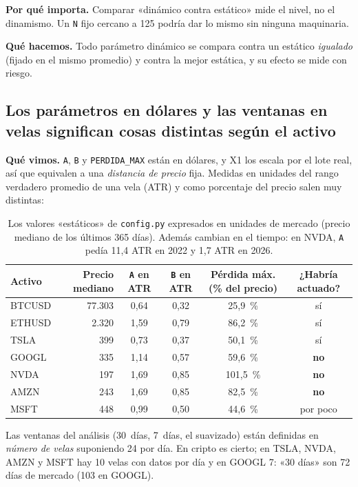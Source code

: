 \documentclass[11pt,a4paper]{article}
\newcommand{\code}[1]{\texttt{\small #1}}
\begin{document}
\textbf{Por qué importa.} Comparar «dinámico contra estático» mide el nivel, no el dinamismo. Un \code{N} fijo
cercano a 125 podría dar lo mismo sin ninguna maquinaria.

\textbf{Qué hacemos.} Todo parámetro dinámico se compara contra un estático \emph{igualado} (fijado en el mismo
promedio) y contra la mejor estática, y su efecto se mide con riesgo.

\subsection{Los parámetros en dólares y las ventanas en velas significan cosas distintas según el activo}
\textbf{Qué vimos.} \code{A}, \code{B} y \code{PERDIDA\_MAX} están en dólares, y X1 los escala por el lote real, así
que equivalen a una \emph{distancia de precio} fija. Medidas en unidades del rango verdadero promedio de una vela
(ATR) y como porcentaje del precio salen muy distintas:

\begin{table}[H]
\centering\small
\begin{tabular}{lrcccc}
\toprule
Activo & Precio mediano & \code{A} en ATR & \code{B} en ATR & Pérdida máx. (\% del precio) & ¿Habría actuado? \\
\midrule
BTCUSD & 77.303 & 0,64 & 0,32 & 25,9~\% & sí \\
ETHUSD & 2.320 & 1,59 & 0,79 & 86,2~\% & sí \\
TSLA & 399 & 0,73 & 0,37 & 50,1~\% & sí \\
GOOGL & 335 & 1,14 & 0,57 & 59,6~\% & \textbf{no} \\
NVDA & 197 & 1,69 & 0,85 & 101,5~\% & \textbf{no} \\
AMZN & 243 & 1,69 & 0,85 & 82,5~\% & \textbf{no} \\
MSFT & 448 & 0,99 & 0,50 & 44,6~\% & por poco \\
\bottomrule
\end{tabular}
\caption{Los valores «estáticos» de \code{config.py} expresados en unidades de mercado (precio mediano de los
últimos 365 días). Además cambian en el tiempo: en NVDA, \code{A} pedía 11,4 ATR en 2022 y 1,7 ATR en 2026.}
\end{table}

Las ventanas del análisis (30~días, 7~días, el suavizado) están definidas en \emph{número de velas} suponiendo
24 por día. En cripto es cierto; en TSLA, NVDA, AMZN y MSFT hay 10 velas con datos por día y en GOOGL 7:
«30 días» son 72 días de mercado (103 en GOOGL).
\end{document}
